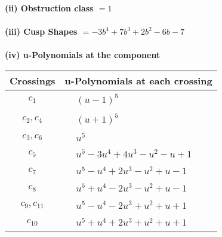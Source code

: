 \documentclass[1p]{elsarticle_modified}
\theoremstyle{definition}
\begin{document}
\flushleft \textbf{(ii) Obstruction class $= 1$}\\~\\
\flushleft \textbf{(iii) Cusp Shapes $= -3 b^4+7 b^3+2 b^2-6 b-7$}\\~\\
\newpage\renewcommand{\arraystretch}{1}
\flushleft \textbf{(iv) u-Polynomials at the component}\newline \\
\begin{tabular}{m{50pt}|m{274pt}}
Crossings & \hspace{64pt}u-Polynomials at each crossing \\
\hline $$\begin{aligned}c_{1}\end{aligned}$$&$\begin{aligned}
&(u-1)^5
\end{aligned}$\\
\hline $$\begin{aligned}c_{2},c_{4}\end{aligned}$$&$\begin{aligned}
&(u+1)^5
\end{aligned}$\\
\hline $$\begin{aligned}c_{3},c_{6}\end{aligned}$$&$\begin{aligned}
&u^5
\end{aligned}$\\
\hline $$\begin{aligned}c_{5}\end{aligned}$$&$\begin{aligned}
&u^5-3 u^4+4 u^3- u^2- u+1
\end{aligned}$\\
\hline $$\begin{aligned}c_{7}\end{aligned}$$&$\begin{aligned}
&u^5- u^4+2 u^3- u^2+u-1
\end{aligned}$\\
\hline $$\begin{aligned}c_{8}\end{aligned}$$&$\begin{aligned}
&u^5+u^4-2 u^3- u^2+u-1
\end{aligned}$\\
\hline $$\begin{aligned}c_{9},c_{11}\end{aligned}$$&$\begin{aligned}
&u^5- u^4-2 u^3+u^2+u+1
\end{aligned}$\\
\hline $$\begin{aligned}c_{10}\end{aligned}$$&$\begin{aligned}
&u^5+u^4+2 u^3+u^2+u+1
\end{aligned}$\\
\hline
\end{tabular}\\~\\
\end{document}
